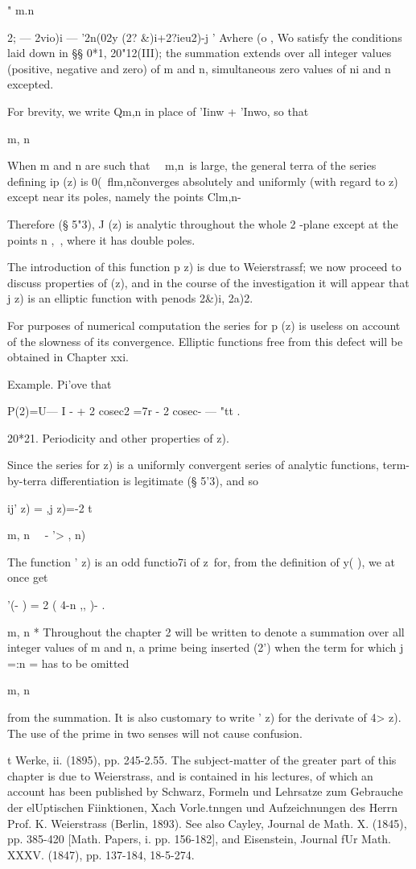  " m.n \ \ {2; — 2vio)i — '2n(02y (2? \&)i+2?ieu2)-j ' Avhere (o , Wo
satisfy the conditions laid down in §§ 0*1, 20"12(III); the summation
extends over all integer values (positive, negative and zero) of m and
n, simultaneous zero values of ni and n excepted.

For brevity, we write Qm,n in place of 'Iinw + 'Inwo, so that

m, n

When m and n are such that \ \ m,n\ is large, the general terra of the
series defining ip (z) is 0(\ flm,n\~%
converges absolutely and uniformly (with regard to z) except near its
poles, namely the points Clm,n-

Therefore (§ 5"3), J (z) is analytic throughout the whole 2 -plane
except at the points n ,\ , where it has double poles.

The introduction of this function p z) is due to Weierstrassf; we now
proceed to discuss properties of (z), and in the course of the
investigation it will appear that j z) is an elliptic function with
penods 2\&)i, 2a)2.

For purposes of numerical computation the series for p (z) is useless
on account of the slowness of its convergence. Elliptic functions free
from this defect will be obtained in Chapter xxi.

Example. Pi'ove that

P(2)=U— I - + 2 cosec2 =7r - 2 cosec- — "tt .

20*21. Periodicity and other properties of z).

Since the series for z) is a uniformly convergent series of analytic
functions, term-by-terra differentiation is legitimate (§ 5'3), and so

ij' z) = ,j z)=-2 t

  m, n \ \ - '> , n)

The function ' z) is an odd functio7i of z\ for, from the definition
of y( ), we at once get

 '(- ) = 2 ( 4-n ,, )- .

m, n * Throughout the chapter 2 will be written to denote a summation
over all integer values of m and n, a prime being inserted (2') when
the term for which j =:n = has to be omitted

m, n

from the summation. It is also customary to write ' z) for the
derivate of 4> z). The use of the prime in two senses will not cause
confusion.

t Werke, ii. (1895), pp. 245-2.55. The subject-matter of the greater
part of this chapter is due to Weierstrass, and is contained in his
lectures, of which an account has been published by Schwarz, Formeln
und Lehrsatze zum Gebrauche der elUptischen Fiinktionen, Xach
Vorle.tnngen und Aufzeichnungen des Herrn Prof. K. Weierstrass
(Berlin, 1893). See also Cayley, Journal de Math. X. (1845), pp.
385-420 [Math. Papers, i. pp. 156-182], and Eisenstein, Journal fUr
Math. XXXV. (1847), pp. 137-184, 18-5-274.

}
